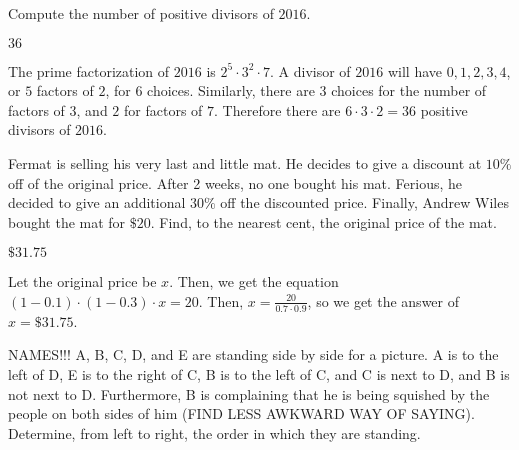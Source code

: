 \documentclass[11pt]{article}
\begin{document}
\begin{problem}
Compute the number of positive divisors of $2016$.
\end{problem}

\begin{answer}
$\boxed{36}$
\end{answer}

\begin{solution}
The prime factorization of $2016$ is $2^5 \cdot 3^2 \cdot 7$. A divisor of $2016$ will have $0, 1, 2, 3, 4$, or $5$ factors of $2$, for $6$ choices. Similarly, there are $3$ choices for the number of factors of $3$, and $2$ for factors of $7$. Therefore there are $6 \cdot 3 \cdot 2 = \boxed{36}$ positive divisors of $2016$.
\end{solution}


\begin{problem} %
Fermat is selling his very last and little mat. He decides to give a discount at $10\%$ off of the original price. After 2 weeks, no one bought his mat. Ferious, he decided to give an additional $30\%$ off the discounted price. Finally, Andrew Wiles bought the mat for $\$20$. Find, to the nearest cent, the original price of the mat.
\end{problem}

\begin{answer}
$\boxed{\$31.75}$
\end{answer}

\begin{solution}
Let the original price be $x$. Then, we get the equation $(1-0.1) \cdot (1-0.3) \cdot x = 20$. Then, $x = \frac{20}{0.7 \cdot 0.9}$, so we get the answer of $x = \boxed{\$31.75}$.
\end{solution}


\begin{problem}

NAMES!!! A, B, C, D, and E are standing side by side for a picture. A is to the left of D, E is to the right of C, B is to the left of C, and C is next to D, and B is not next to D. Furthermore, B is complaining that he is being squished by the people on both sides of him (FIND LESS AWKWARD WAY OF SAYING). Determine, from left to right, the order in which they are standing.
\end{problem}
\end{document}
